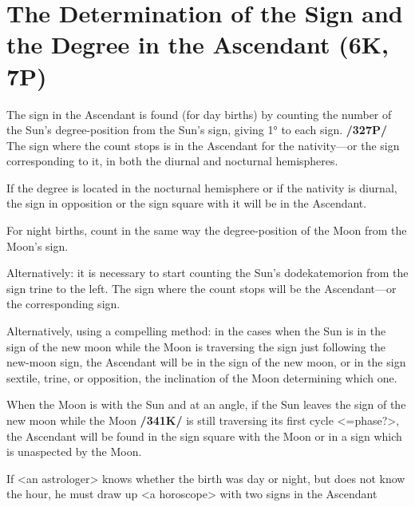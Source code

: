 \section{The Determination of the Sign and the Degree in the Ascendant (6K, 7P)}

The sign in the Ascendant is found (for day births) by counting the number of the Sun's degree-position from the Sun's sign, giving 1° to each sign. \textbf{/327P/} The sign where the count stops is in the Ascendant for the nativity—or the sign corresponding to it, in both the diurnal and nocturnal hemispheres. 

If the degree is located in the nocturnal hemisphere or if the nativity is diurnal, the sign in opposition or the sign square with it will be in the Ascendant. 

For night births, count in the same way the degree-position of the Moon from the Moon’s sign. 

Alternatively: it is necessary to start counting the Sun’s dodekatemorion from the sign trine to the left. The sign where the count stops will be the Ascendant—or the corresponding sign.

Alternatively, using a compelling method: in the cases when the Sun is in the sign of the new moon while the Moon is traversing the sign just following the new-moon sign, the Ascendant will be in the sign of the new moon, or in the sign sextile, trine, or opposition, the inclination of the Moon determining which one. 

When the Moon is with the Sun and at an angle, if the Sun leaves the sign of the new moon while the Moon \textbf{/341K/} is still traversing its first cycle <=phase?>, the Ascendant will be found in the sign
square with the Moon or in a sign which is unaspected by the Moon. 

If <an astrologer> knows whether the birth was day or night, but does not know the hour, he must draw up <a horoscope> with two signs in the Ascendant

\newpage
